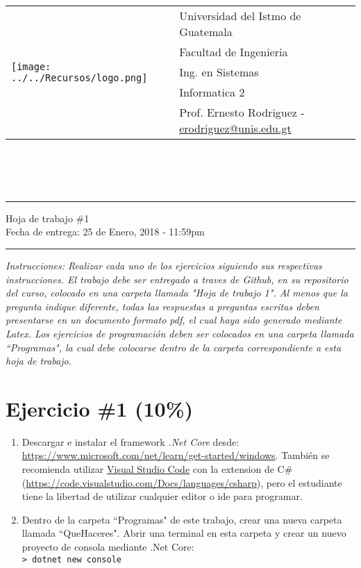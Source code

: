 \documentclass{article}
\newcommand{\horrule}[1]{\rule{\linewidth}{#1}}
\newcommand{\perlscript}[2]{
\begin{itemize}
\item[]
\end{itemize}
}
\begin{document}
\begin{tabular}{l l}
\multirow{5}{*}{\texttt{[image: ../../Recursos/logo.png]}} & Universidad del Istmo de Guatemala \\
 & Facultad de Ingenieria \\
 & Ing. en Sistemas \\
 & Informatica 2 \\
 & Prof. Ernesto Rodriguez - \href{mailto:erodriguez@unis.edu.gt}{erodriguez@unis.edu.gt} \\
\end{tabular}
\\\\\\

\begin{center}
        \horrule{0.5pt}
        \huge{Hoja de trabajo \#1} \\
        \large{Fecha de entrega: 25 de Enero, 2018 - 11:59pm} \\
        \horrule{1pt}
\end{center}

\emph{Instrucciones: Realizar cada uno de los ejercicios siguiendo sus respectivas
instrucciones. El trabajo debe ser entregado a traves de Github, en su repositorio del curso, colocado en una carpeta llamada "Hoja de trabajo 1".
Al menos que la pregunta indique diferente, todas las respuestas a preguntas escritas deben presentarse en
un documento formato pdf, el cual haya sido generado mediante Latex. Los ejercicios de programaci\'on deben ser colocados en una carpeta
llamada ``Programas", la cual debe colocarse dentro de la carpeta correspondiente a esta hoja de trabajo.}


\section*{Ejercicio \#1 (10\%)}

\begin{enumerate}
        \item {
                Descargar e instalar el framework \emph{.Net Core} desde: 
                \url{https://www.microsoft.com/net/learn/get-started/windows}. Tambi\'en se recomienda utilizar
                \href{https://code.visualstudio.com/}{Visual Studio Code} con la extension de 
                C\# (\url{https://code.visualstudio.com/Docs/languages/csharp}), pero el estudiante tiene la
                libertad de utilizar cualquier editor o ide para programar.
        }
        \item {
                Dentro de la carpeta ``Programas" de este trabajo, crear una
                nueva carpeta llamada ``QueHaceres". Abrir una terminal en esta
                carpeta y crear un nuevo proyecto de consola mediante .Net Core:
                \\\texttt{> dotnet new console}
        }
\end{enumerate}
\end{document}
